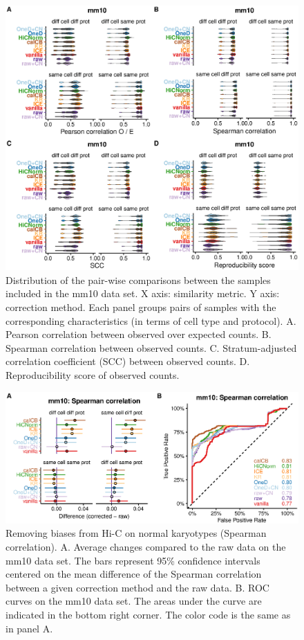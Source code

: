 \documentclass[12pt]{report}
\begin{document}
\begin{figure}
	\centerline{\includegraphics[width=\textwidth]{nar_figures/supp_figure_7.eps}}
  \caption{Distribution of the pair-wise comparisons between the samples
included in the mm10 data set. X axis: similarity metric. Y axis:
correction method. Each panel groups pairs of samples with the
corresponding characteristics (in terms of cell type and protocol). A.
Pearson correlation between observed over expected counts. B. Spearman
correlation between observed counts. C. Stratum-adjusted correlation
coefficient (SCC) between observed counts. D. Reproducibility score of
observed counts.}
\end{figure}

\begin{figure}
	\centerline{\includegraphics[width=\textwidth]{nar_figures/supp_figure_8.eps}}
  \caption{Removing biases from Hi-C on normal karyotypes (Spearman
correlation). A. Average changes compared to the raw data on the mm10 data
set. The bars represent 95\% confidence intervals centered on the mean
difference of the Spearman correlation between a given correction method
and the raw data. B. ROC curves on the mm10 data set. The areas under the
curve are indicated in the bottom right corner. The color code is the same
as in panel A.}
\end{figure}
\end{document}
